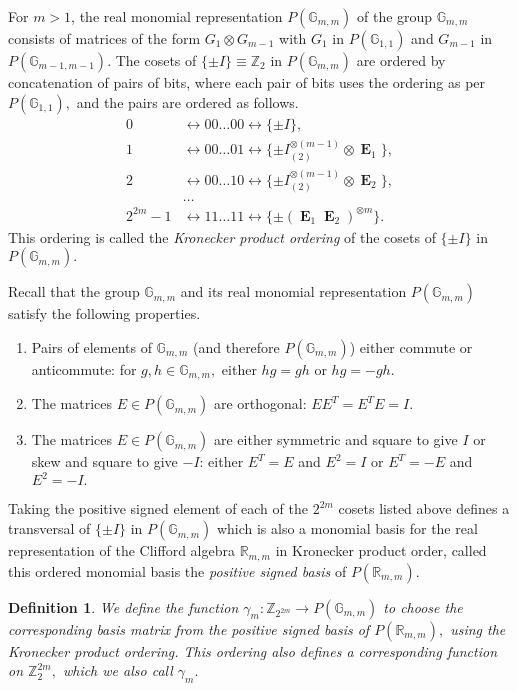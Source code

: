 \documentclass[12pt,a4paper]{article}
\newcommand{\mb}[1]{\mathbb{#1}}
\newcommand{\mf}[1]{\mathbf{#1}}
\newcommand{\oE}{\mf{\operatorname{E}}}
\newcommand{\G}{\mb{G}}
\newcommand{\R}{\mb{R}}
\newcommand{\Z}{\mb{Z}}
\newcommand{\Rep}{P}
\newcommand{\To}{\rightarrow}
\newtheorem*{definition}{Definition}
\begin{document}
For $m > 1$,
the real monomial representation $\Rep(\G_{m,m})$ of the 
group $\G_{m,m}$ consists of matrices of the form $G_1 \otimes G_{m-1}$
with $G_1$ in $\Rep(\G_{1,1})$ and $G_{m-1}$ in $\Rep(\G_{m-1,m-1}).$
The cosets of $\{\pm I\} \equiv \Z_2$ in $\Rep(\G_{m,m})$ are
ordered by concatenation of pairs of bits, 
where each pair of bits uses the ordering as per $\Rep(\G_{1,1}),$
and the pairs are ordered as follows.
\begin{align*}
0 &\leftrightarrow 00 \ldots 00 \leftrightarrow \{ \pm I \},
\\
1 &\leftrightarrow 00 \ldots 01 \leftrightarrow \{ \pm I_{(2)}^{\otimes {(m-1)}} \otimes  \oE_1 \},
\\
2 &\leftrightarrow 00 \ldots 10 \leftrightarrow \{ \pm I_{(2)}^{\otimes {(m-1)}} \otimes  \oE_2 \},
\\
&\ldots
\\
2^{2m} - 1 &\leftrightarrow 11 \ldots 11 \leftrightarrow \{ \pm (\oE_1 \oE_2)^{\otimes {m}} \}.
\end{align*}
This ordering is called 
the \emph{Kronecker product ordering} of the cosets of $\{\pm I\}$ in $\Rep(\G_{m,m}).$

Recall that
the group $\G_{m,m}$ and its real monomial representation $\Rep(\G_{m,m})$ 
satisfy the following properties.
\begin{enumerate}
\item 
Pairs of elements of $\G_{m,m}$ (and therefore $\Rep(\G_{m,m})$) either commute or anti\-commute:
for $g, h \in \G_{m,m},$ either $h g = g h$ or $h g = - g h.$
\item
The matrices $E \in \Rep(\G_{m,m})$ are orthogonal: $E E^T = E^T E = I.$
\item
The matrices $E \in \Rep(\G_{m,m})$ are either symmetric and square to give $I$ or 
skew and square to give $-I$: either $E^T = E$ and $E^2 =I$ or $E^T = -E$ and $E^2 = -I.$
\end{enumerate}

Taking the positive signed element of each of the $2^{2m}$ cosets listed above
defines a transversal of $\{\pm I\}$ in $\Rep(\G_{m,m})$
which is also a monomial basis for the real representation of the Clifford algebra $\R_{m,m}$ in 
Kronecker product order,
called this ordered monomial basis the \emph{positive signed basis} of $\Rep(\R_{m,m}).$ 

\begin{definition}\label{definition-gamma}
We define the function $\gamma_m : \Z_{2^{2 m}} \To \Rep(\G_{m,m})$ 
to choose the corresponding basis matrix from the positive signed basis of $\Rep(\R_{m,m}),$
using the Kronecker product ordering.
This ordering also defines a corresponding function on $\Z_2^{2 m},$
which we also call $\gamma_m.$
\end{definition}
\end{document}
